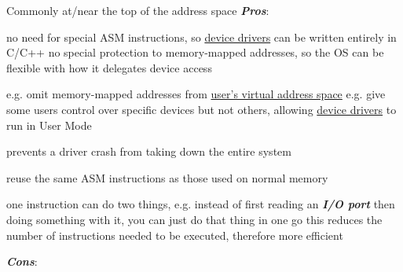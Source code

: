 \begin{itemize}

    \vItem
          Commonly at/near the top of the address space
    \vItem
          \textbf{ \textit{Pros}}:

          \begin{itemize}

              \vItem
                    no need for special ASM instructions, so \ul{device drivers} can be written entirely in
                    C/C++
              \vItem
                    no special protection to memory-mapped addresses, so the OS can be
                    flexible with how it delegates device access

                    \begin{itemize}

                        \vItem
                              e.g. omit memory-mapped addresses from \ul{user's virtual address
                              space}
                        \vItem
                              e.g. give some users control over specific devices but not others,
                              allowing \ul{device drivers} to
                              run in User Mode

                              \begin{itemize}

                                  \vItem
                                        prevents a driver crash from taking down the entire system
                              \end{itemize}
                    \end{itemize}
              \vItem
                    reuse the same ASM instructions as those used on normal memory

                    \begin{itemize}

                        \vItem
                              one instruction can do two things, e.g. instead of first reading
                              an \textbf{ \textit{I/O port}} then doing something with it, you can
                              just do that thing in one go
                        \vItem
                              this reduces the number of instructions needed to be executed,
                              therefore more efficient
                    \end{itemize}
          \end{itemize}
    \vItem
          \textbf{ \textit{Cons}}:


\end{itemize}
